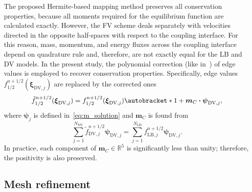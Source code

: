 \documentclass{elsarticle} %
\DeclarePairedDelimiter\autobracket()       %
\newcommand{\br}[1]{\autobracket*{#1}}
\newcommand{\bxi}{\boldsymbol{\xi}}
\newcommand{\bpsi}{\boldsymbol{\psi}}
\newcommand{\bm}{\boldsymbol{m}}
\newcommand{\bdot}{\boldsymbol{\cdot}}
\newcommand{\LB}{\mathrm{LB}}
\newcommand{\DV}{\mathrm{DV}}
\begin{document}
The proposed Hermite-based mapping method preserves all conservation properties,
because all moments required for the equilibrium function are calculated exactly.
However, the FV scheme deals separately with velocities
directed in the opposite half-spaces with respect to the coupling interface.
For this reason, mass, momentum, and energy fluxes across the coupling interface
depend on quadrature rule and, therefore, are not exactly equal for the LB and DV models.
In the present study, the polynomial correction (like in~\cite{Aristov1980})
of edge values is employed to recover conservation properties.
Specifically, edge values \(f^{n+1/2}_{1/2}(\bxi_{\DV,j})\) are replaced by the corrected ones
\begin{equation}\label{eq:poly_correction}
    \tilde{f}^{n+1/2}_{1/2}(\bxi_{\DV,j}) = f^{n+1/2}_{1/2}(\bxi_{\DV,j}) \br{ 1 + \bm_C\bdot\bpsi_{\DV,j} },
\end{equation}
where \(\bpsi_j\) is defined in~\eqref{eq:m_solution} and \(\bm_C\) is found from
\begin{equation}\label{eq:m_correction}
    \sum_{j=1}^{N_{\DV}} \tilde{f}^{n+1/2}_{\DV,j}\bpsi_{\DV,j} =
        \sum_{j=1}^{N_{\LB}} f^{n+1/2}_{\LB,j}\bpsi_{\DV,j}.
\end{equation}
In practice, each component of \(\bm_C\in\mathbb{R}^5\) is significantly less than unity;
therefore, the positivity is also preserved.

\subsection{Mesh refinement}\label{sec:numerics:refinement}
\end{document}

